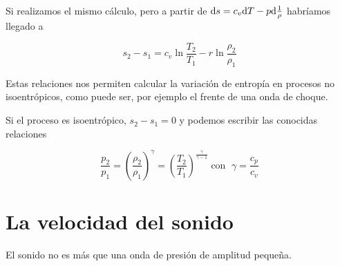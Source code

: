 	
	Si realizamos el mismo cálculo, pero a partir de $\text{d} s=c_{v}\text{d} T-p\text{d}\frac{1}{\rho}$
	habríamos llegado a 
	
\begin{equation}
		s_{2}-s_{1}=c_{v}\ln\frac{T_{2}}{T_{1}}-r\ln\frac{\rho_{2}}{\rho_{1}}
\end{equation}
	
	
	Estas relaciones nos permiten calcular la variación de entropía en
	procesos no isoentrópicos, como puede ser, por ejemplo el frente de
	una onda de choque.
	
	Si el proceso es isoentrópico, $s_{2}-s_{1}=0$ y podemos escribir
	las conocidas relaciones 
	
\begin{equation}
		\frac{p_{2}}{p_{1}}=\left(\frac{\rho_{2}}{\rho_{1}}\right)^{\gamma}=\left(\frac{T_{2}}{T_{1}}\right)^{\frac{\gamma}{\gamma-1}}\;\text{con }\;\gamma=\frac{c_{p}}{c_{v}}
\end{equation}
	
	

\section{La velocidad del sonido}

	
	El sonido no es más que una onda de presión de amplitud pequeña.
	
	\medskip{}
	
